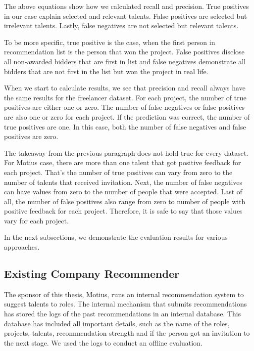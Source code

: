 The above equations show how we calculated recall and precision. True positives in our case explain selected and relevant talents. False positives are selected but irrelevant talents. Lastly, false negatives are not selected but relevant talents.

To be more specific, true positive is the case, when the first person in recommendation list is the person that won the project. False positives disclose all non-awarded bidders that are first in list and false negatives demonstrate all bidders that are not first in the list but won the project in real life. 

When we start to calculate results, we see that precision and recall always have the same results for the freelancer dataset. For each project, the number of true positives are either one or zero. The number of false negatives or false positives are also one or zero for each project. If the prediction was correct, the number of true positives are one. In this case, both the number of false negatives and false positives are zero.

The takeaway from the previous paragraph does not hold true for every dataset. For Motius case, there are more than one talent that got positive feedback for each project. That's the number of true positives can vary from zero to the number of talents that received invitation. Next, the number of false negatives can have values from zero to the number of people that were accepted. Last of all, the number of false positives also range from zero to number of people with positive feedback for each project. Therefore, it is safe to say that those values vary for each project.

In the next subsections, we demonstrate the evaluation results for various approaches.


\subsection{Existing Company Recommender}

The sponsor of this thesis, Motius, runs an internal recommendation system to suggest talents to roles. The internal mechanism that submits recommendations has stored the logs of the past recommendations in an internal database. This database has included all important details, such as the name of the roles, projects, talents, recommendation strength and if the person got an invitation to the next stage. We used the logs to conduct an offline evaluation.

